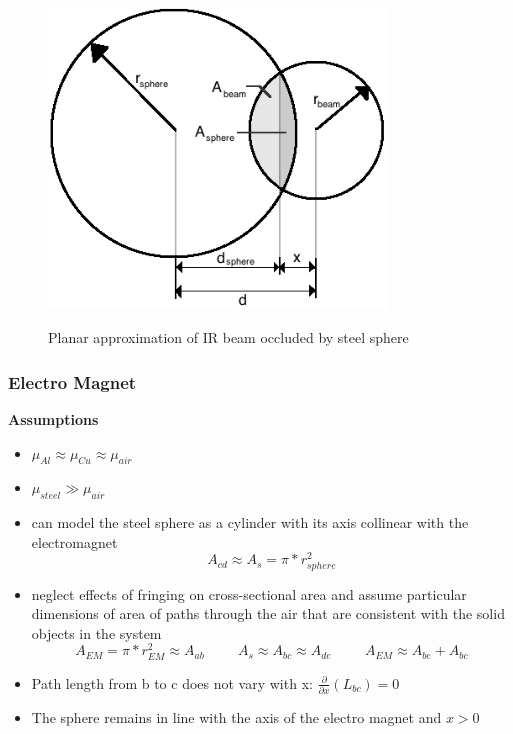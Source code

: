\documentclass{article}
\theoremstyle{plain}
\theoremstyle{definition}
\theoremstyle{remark}
\begin{document}
\begin{figure}
\begin{center}
\includegraphics[width = 9cm]{beam_sphere_diagram.png}
\label{Q1_a1}
\caption{Planar approximation of IR beam occluded by steel sphere}
\end{center}
\end{figure}

\subsubsection{Electro Magnet}
\textbf{Assumptions}
\begin{itemize}
\item $ \mu_{Al} \approx \mu_{Cu} \approx \mu_{air} $ 
\item $ \mu_{steel} \gg \mu_{air} $
\item can model the steel sphere as a cylinder with its axis collinear with the electromagnet  \\ 
$$A_{cd} \approx A_{s} = \pi * r_{sphere}^2 $$ 
\item neglect effects of fringing on cross-sectional area and assume particular dimensions of area of paths through the air that are consistent with the solid objects in the system \\
$$ A_{EM} = \pi*r_{EM}^2 \approx A_{ab} \hspace{1cm} A_{s} \approx A_{bc} \approx A_{de} \hspace{1cm} A_{EM} \approx A_{be} + A_{bc} $$ 
\item Path length from b to c does not vary with x: 
$ \frac{\partial}{\partial x} (L_{bc}) = 0$
\item The sphere remains in line with the axis of the electro magnet and $ x > 0$
\end{itemize}
\end{document}
